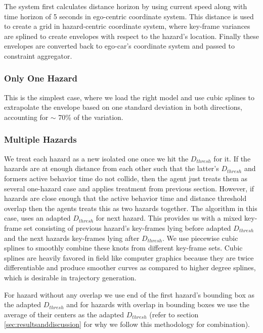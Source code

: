 \documentclass{article}
\begin{document}
The system first calculates distance horizon by using current speed along with
time horizon of 5 seconds in ego-centric coordinate system. This distance is used 
to create a grid in hazard-centric coordinate system, where key-frame variances
are splined to create envelopes with respect to the hazard's location. Finally 
these envelopes are converted back to ego-car's coordinate system and passed
to constraint aggregator.

\subsubsection{Only One Hazard}

This is the simplest case, where we load the right model and use cubic splines
to extrapolate the envelope based on one standard deviation in both directions, 
accounting for $\sim$ 70\% of the variation.

\subsubsection{Multiple Hazards}

We treat each hazard as a new isolated one once we hit the $D_{thresh}$ for it. If 
the hazards are at enough distance from each other such that the latter's $D_{thresh}$
and formers active behavior time do not collide, then the agent just treats them 
as several one-hazard case and applies treatment from previous section. However, if 
hazards are close enough that the active behavior time and distance threshold overlap then
the agents treats this as two hazards together. The algorithm in this case, uses an
adapted $D_{thresh}$ for next hazard. This provides us with a mixed key-frame set 
consisting of previous hazard's key-frames lying before adapted $D_{thresh}$ and the 
next hazards key-frames lying after $D_{thresh}$. We use piecewise cubic splines
to smoothly combine these knots from different key-frame sets. Cubic splines are heavily favored 
in field like 
computer graphics \cite{fritsch1980monotone,brodlie1991preserving} because they are 
twice differentiable and produce smoother curves as compared to higher degree splines,
which is desirable in trajectory generation.

For hazard without any overlap we use end of the first hazard's bounding box as the
adapted $D_{thresh}$ and for hazards with overlap in bounding boxes we use the
average of their centers as the adapted $D_{thresh}$ (refer to section \ref{sec:resultsanddiscussion} for why we follow this methodology for combination).
\end{document}

